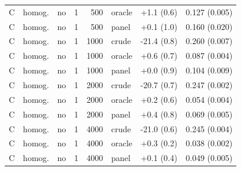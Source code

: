 \documentclass[11pt,a4paper]{article}
\begin{document}
\begin{longtable}{clcrrlcc}
C & homog. & no & 1 & 500 & oracle & +1.1 (0.6) & 0.127 (0.005) \\
C & homog. & no & 1 & 500 & panel & +0.1 (1.0) & 0.160 (0.020) \\
C & homog. & no & 1 & 1000 & crude & -21.4 (0.8) & 0.260 (0.007) \\
C & homog. & no & 1 & 1000 & oracle & +0.6 (0.7) & 0.087 (0.004) \\
C & homog. & no & 1 & 1000 & panel & +0.0 (0.9) & 0.104 (0.009) \\
C & homog. & no & 1 & 2000 & crude & -20.7 (0.7) & 0.247 (0.002) \\
C & homog. & no & 1 & 2000 & oracle & +0.2 (0.6) & 0.054 (0.004) \\
C & homog. & no & 1 & 2000 & panel & +0.4 (0.8) & 0.069 (0.005) \\
C & homog. & no & 1 & 4000 & crude & -21.0 (0.6) & 0.245 (0.004) \\
C & homog. & no & 1 & 4000 & oracle & +0.3 (0.2) & 0.038 (0.002) \\
C & homog. & no & 1 & 4000 & panel & +0.1 (0.4) & 0.049 (0.005) \\
\bottomrule
\end{longtable}
\end{document}
